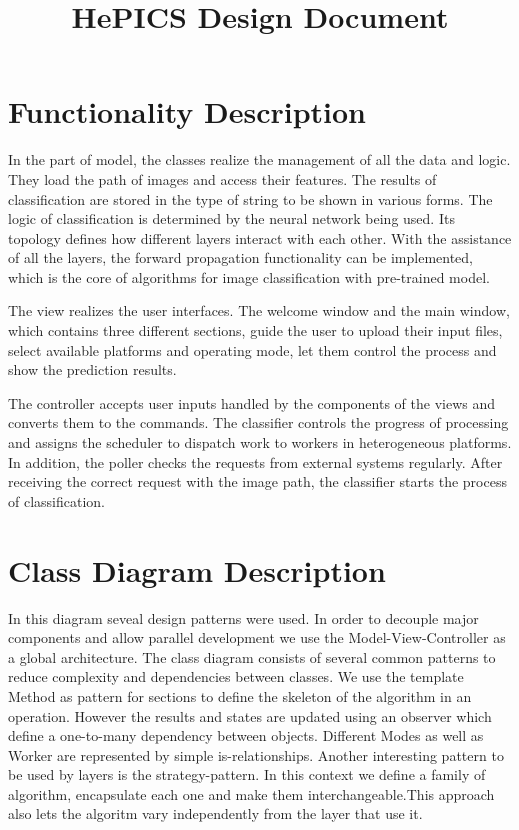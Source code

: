 \documentclass[parskip=full]{scrartcl}
\title{HePICS Design Document}
\begin{document}
\maketitle
\thispagestyle{empty}
\pagebreak





\tableofcontents
\pagebreak





\section {Functionality Description}

In the part of model, the classes realize the management of all the data and logic. They load the path of images and access their features. The results of classification are stored in the type of string to be shown in various forms. The logic of classification is determined by the neural network being used. Its topology defines how different layers interact with each other. With the assistance of all the layers, the forward propagation functionality can be implemented, which is the core of algorithms for image classification with pre-trained model.

The view realizes the user interfaces. The welcome window and the main window, which contains three different sections, guide the user to upload their input files, select available platforms and operating mode, let them control the process and show the prediction results. 

The controller accepts user inputs handled by the components of the views and converts them to the commands. The classifier controls the progress of processing and assigns the scheduler to dispatch work to workers in heterogeneous platforms. In addition, the poller checks the requests from external systems regularly. After receiving the correct request with the image path, the classifier starts the process of classification.

\section {Class Diagram Description}

In this diagram seveal design patterns were used.
In order to decouple  major components and allow parallel development we use the Model-View-Controller as a global architecture.
The class diagram consists of several common patterns to reduce complexity and dependencies between classes.
We use the template Method as pattern for sections to define the skeleton of the algorithm in an operation.
However the results and states are updated using an observer which define a one-to-many dependency between objects.
Different Modes as well as Worker are represented by simple is-relationships.
Another interesting pattern to be used by layers is the strategy-pattern. In this context we define a family of algorithm, encapsulate
each one and make them interchangeable.This approach also lets the algoritm vary independently from the layer that use it.
\end{document}
